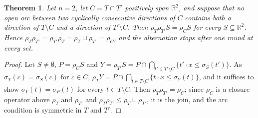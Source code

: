 \documentclass[11pt]{amsart}
\newtheorem{thm}{Theorem}[section]
\theoremstyle{definition}
\begin{document}
\begin{thm}\label{thm:oneround}
Let $n=2$, let $C=T\cap T'$ positively span $\mathbb R^2$, and suppose
that no open arc between two cyclically consecutive directions of $C$
contains both a direction of $T\setminus C$ and a direction of
$T'\setminus C$. Then $\rho_T\rho_{T'}S=\rho_CS$ for every $S\subseteq
\mathbb R^2$. Hence $\rho_T\rho_{T'}=\rho_{T'}\rho_T=\rho_T\sqcup
\rho_{T'}=\rho_C$, and the alternation stops after one round at every
set.
\end{thm}
\begin{proof}
Let $S\ne\emptyset$, $P=\rho_CS$ and $Y=\rho_{T'}S=P\cap\bigcap_{t'\in
T'\setminus C}\{t'\cdot x\le\sigma_S(t')\}$. As $\sigma_Y(c)=\sigma_S(c)$
for $c\in C$, $\rho_TY=P\cap\bigcap_{t\in T\setminus C}\{t\cdot x\le
\sigma_Y(t)\}$, and it suffices to show $\sigma_Y(t)=\sigma_P(t)$ for
every $t\in T\setminus C$. Then $\rho_T\rho_{T'}=\rho_C$; since $\rho_C$
is a closure operator above $\rho_T$ and $\rho_{T'}$ and $\rho_T
\rho_{T'}\le\rho_T\sqcup\rho_{T'}$, it is the join, and the arc
condition is symmetric in $T$ and $T'$.


\end{proof}
\end{document}
